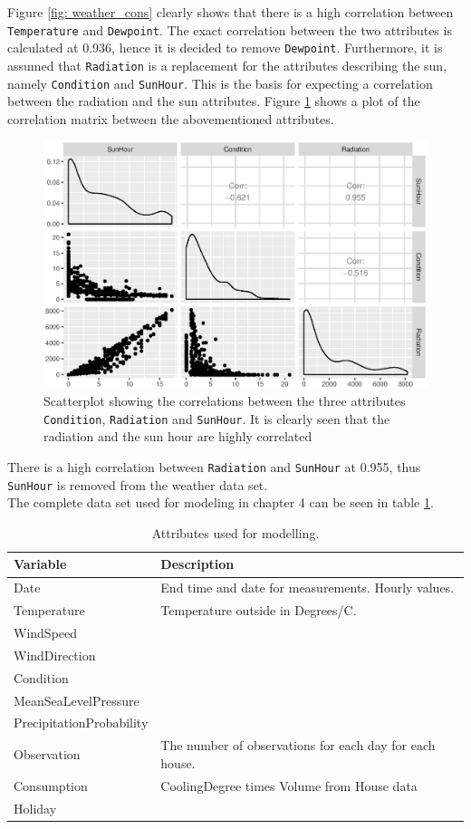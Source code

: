 \noindent Figure \ref{fig: weather_cons} clearly shows that there is a high correlation between \texttt{Temperature} and \texttt{Dewpoint}. The exact correlation between the two attributes is calculated at 0.936, hence it is decided to remove \texttt{Dewpoint}. Furthermore, it is assumed that \texttt{Radiation} is a replacement for the attributes describing the sun, namely \texttt{Condition} and \texttt{SunHour}. This is the basis for expecting a correlation between the radiation and the sun attributes. Figure \ref{fig: gg_cor} shows a plot of the correlation matrix between the abovementioned attributes.
\begin{figure}
    \centering
    \includegraphics[width=.8\textwidth]{../../../figures/gg_cor.eps}
    \caption{Scatterplot showing the correlations between the three attributes \texttt{Condition}, \texttt{Radiation} and \texttt{SunHour}. It is clearly seen that the radiation and the sun hour are highly correlated}
    \label{fig: gg_cor}
\end{figure}
\noindent There is a high correlation between \texttt{Radiation} and \texttt{SunHour} at 0.955, thus \texttt{SunHour} is removed from the weather data set. \\
 
\noindent The complete data set used for modeling in chapter 4 can be seen in table \ref{tab: modeldata}. 
\begin{table}
    \centering
    \begin{tabular}{ll}
     \hline
     \textbf{Variable} & \textbf{Description} \\
    \hline
    \hline
    Date  &  End time and date for measurements. Hourly values.\\
    Temperature  &  Temperature outside in Degrees/C. \\
    WindSpeed  &  \\
    WindDirection  &  \\
    Condition  & \\
    MeanSeaLevelPressure  & \\
    PrecipitationProbability & \\
    Observation & The number of observations for each day for each house.\\
    Consumption & CoolingDegree times Volume from House data \\
    Holiday & \\
    \hline
    \end{tabular}
    \caption{Attributes used for modelling.}
    \label{tab: modeldata}
\end{table}   